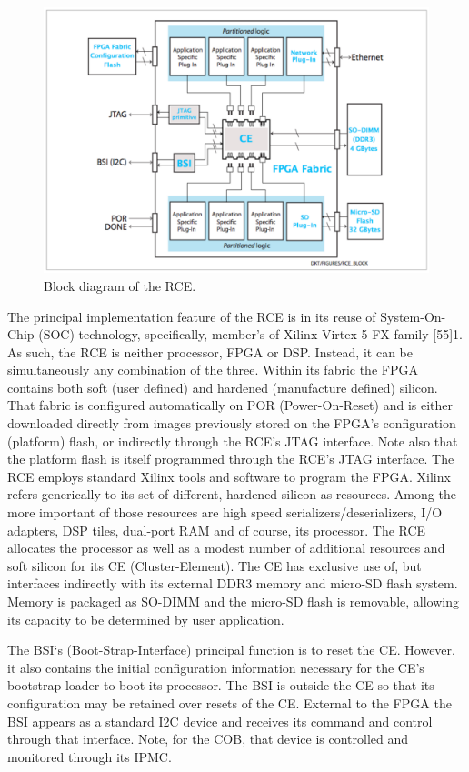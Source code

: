 \begin{figure}[tbh]
\includegraphics[scale=0.8]{rce-block.pdf}
\caption{Block diagram of the RCE.}
\label{fig:RCEblock}
\end{figure} 

The principal implementation feature of the RCE is in its reuse of System-On-Chip (SOC) technology, specifically, member's of Xilinx Virtex-5 FX family [55]1. As such, the RCE is neither processor, FPGA or DSP. Instead, it can be simultaneously any combination of the three. Within its fabric the FPGA contains both soft (user defined) and hardened (manufacture defined) silicon. That fabric is configured automatically on POR (Power-On-Reset) and is either downloaded directly from images previously stored on the FPGA's configuration (platform) flash, or indirectly through the RCE's JTAG interface. Note also that the platform flash is itself programmed through the RCE's JTAG interface. The RCE employs standard Xilinx tools and software to program the FPGA.
Xilinx refers generically to its set of different, hardened silicon as resources. Among the more important of those resources are high speed serializers/deserializers, I/O adapters, DSP tiles, dual-port RAM and of course, its processor. The RCE allocates the processor as well as a modest number of additional resources and soft silicon for its CE (Cluster-Element). The CE has exclusive use of, but interfaces indirectly with its external DDR3 memory and micro-SD flash system. Memory is packaged as SO-DIMM and the micro-SD flash is removable, allowing its capacity to be determined by user application.

The BSI‘s (Boot-Strap-Interface) principal function is to reset the CE. However, it also contains the initial configuration information necessary for the CE's bootstrap loader to boot its processor. The BSI is outside the CE so that its configuration may be retained over resets of the CE. External to the FPGA the BSI appears as a standard I2C device and receives its command and control through that interface. Note, for the COB, that device is controlled and monitored through its IPMC.

